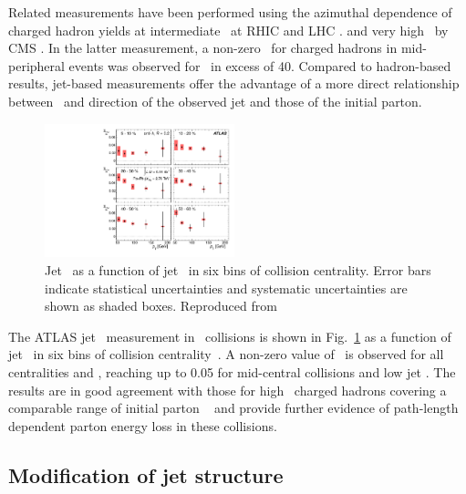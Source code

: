 Related measurements have been performed using the azimuthal dependence
of charged hadron yields at intermediate \pT\ at RHIC and LHC
\cite{Adams:2004wz,Adler:2006bw,Adare:2010sp, ATLAS:2011ah, Abelev:2012di}.
and very high \pT\ by CMS \cite{Chatrchyan:2012xq}. In the latter 
measurement, a non-zero \vtwo\ for charged hadrons in mid-peripheral 
events was observed for \pT\ in excess of 40\GeVc.
Compared to hadron-based results, jet-based measurements offer the advantage
of a more direct relationship between \pT\ and direction of the observed
jet and those of the initial parton.

\begin{figure}[!th]
\begin{center}
\includegraphics[width=0.49\textwidth]{jetfigures/ATLAS_jetv2.pdf}
\caption{Jet \vtwo\ as a function of jet \pT\ in six bins of 
collision centrality.
Error bars indicate statistical uncertainties and 
systematic uncertainties are shown as shaded boxes. Reproduced from~\cite{Aad:2013sla}}
\label{fig:GR:ATLAS_jet_v2}
\end{center}
\end{figure}

The ATLAS jet \vtwo\ measurement in \PbPb\ collisions 
is shown in Fig.~\ref{fig:GR:ATLAS_jet_v2} as a function of jet \pT\ 
in six bins of collision centrality~\cite{Aad:2013sla}. A non-zero
value of \vtwo\ is observed for all centralities and \pT, reaching up to 0.05 for
mid-central collisions and low jet \pT. The results are in good agreement
with those for high \pT\ charged hadrons covering a comparable range
of initial parton \pT~\cite{Chatrchyan:2012xq} and provide further 
evidence of path-length dependent parton energy loss in these collisions.

\subsection{Modification of jet structure}


